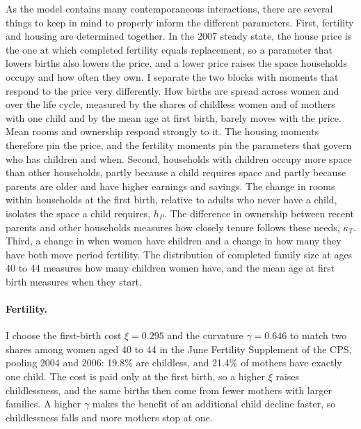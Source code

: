 As the model contains many contemporaneous interactions, there are several things to keep in mind to properly inform the different parameters. First, fertility and housing are determined together. In the
2007 steady state, the house price is the one at which completed fertility
equals replacement, so a parameter that lowers births also lowers the price,
and a lower price raises the space households occupy and how often they own.
I separate the two blocks with moments that respond to the price very
differently. How births are spread across women and over the life cycle,
measured by the shares of childless women and of mothers with one child and
by the mean age at first birth, barely moves with the price. Mean rooms and
ownership respond strongly to it. The housing moments therefore pin the
price, and the fertility moments pin the parameters that govern who has
children and when.
Second, households with children occupy more space than other households,
partly because a child requires space and partly because parents are older
and have higher earnings and savings. The change in rooms within households
at the first birth, relative to adults who never have a child, isolates the
space a child requires, $h_P$. The difference in ownership between recent
parents and other households measures how closely tenure follows these
needs, $\kappa_T$.
Third, a change in when women
have children and a change in how many they have both move period fertility.
The distribution of completed family size at ages 40 to 44 measures how many
children women have, and the mean age at first birth measures when they
start.

\paragraph{Fertility.}
I choose the first-birth cost $\xi=0.295$ and the curvature $\gamma=0.646$
to match two shares among women aged 40 to 44 in the June Fertility
Supplement of the CPS, pooling 2004 and 2006: 19.8\% are childless, and
21.4\% of mothers have exactly one child. The cost is paid only at the first
birth, so a higher $\xi$ raises childlessness, and the same births then come
from fewer mothers with larger families. A higher $\gamma$ makes the benefit
of an additional child decline faster, so childlessness falls and more
mothers stop at one.

